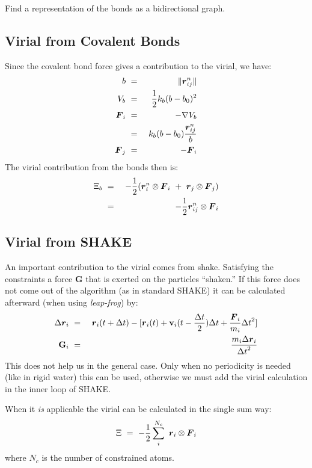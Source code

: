 Find a representation of the bonds as a bidirectional graph.

\subsection{Virial from Covalent Bonds}
Since the covalent bond force gives a contribution to the virial, we have:
\begin{eqnarray}
b	&~=~&	\|\rnij\|					\\
V_b	&~=~&	\half k_b(b-b_0)^2				\\
\Fvi	&~=~&	-\nabla V_b					\\
	&~=~&	k_b(b-b_0)\frac{\rnij}{b}			\\
\Fvj	&~=~&	-\Fvi
\end{eqnarray}
The virial contribution from the bonds then is:
\begin{eqnarray}
\Xi_b	&~=~&	-\half(\rni\otimes\Fvi~+~\rvj\otimes\Fvj)	\\
	&~=~&	-\half\rnij\otimes\Fvi
\end{eqnarray}

\subsection{Virial from SHAKE}
An important contribution to the virial comes from shake. Satisfying 
the constraints a force {\bf G} that is exerted on the particles ``shaken.'' If this
force does not come out of the algorithm (as in standard SHAKE) it can be
calculated afterward (when using {\em leap-frog}) by:
\begin{eqnarray}
\Delta\rvi&~=~&\rvi(t+\Dt)-
[\rvi(t)+{\bf v}_i(t-\frac{\Dt}{2})\Dt+\frac{\Fvi}{m_i}\Dt^2]	\\
{\bf G}_i&~=~&\frac{m_i\Delta\rvi}{\Dt^2}
\end{eqnarray}
This does not help us in the general case. Only when no periodicity
is needed (like in rigid water) this can be used, otherwise
we must add the virial calculation in the inner loop of SHAKE.

When it {\em is} applicable the virial can be calculated in the single sum way:
\begin{equation}
\Xi~=~-\half\sum_i^{N_c}~\rvi\otimes\Fvi
\end{equation}
where $N_c$ is the number of constrained atoms.


